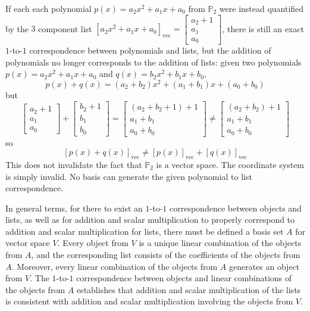 \documentclass{article}
\begin{document}
\vspace{1cm}
   
If each each polynomial \(p(x) = a_2 x^2 + a_1 x + a_0\) from \(\mathbb{P}_2\) were instead quantified by the \(3\) component list \([a_2 x^2 + a_1 x + a_0]_{\text{vec}} = \begin{bmatrix} a_2 + 1 \\ a_1 \\ a_0 \end{bmatrix}\), there is still an exact \(1\)-to-\(1\) correspondence between polynomials and lists, but the addition of polynomials no longer corresponds to the addition of lists: given two polynomials \(p(x) = a_2 x^2 + a_1 x + a_0\) and \(q(x) = b_2 x^2 + b_1 x + b_0\),
\[p(x) + q(x) = (a_2 + b_2)x^2 + (a_1 + b_1)x + (a_0 + b_0)\]
but
\[\begin{bmatrix} a_2 + 1 \\ a_1 \\ a_0 \end{bmatrix} + \begin{bmatrix} b_2 + 1 \\ b_1 \\ b_0 \end{bmatrix} = \begin{bmatrix} (a_2 + b_2 + 1) + 1 \\ a_1 + b_1 \\ a_0 + b_0 \end{bmatrix} \neq \begin{bmatrix} (a_2 + b_2) + 1 \\ a_1 + b_1 \\ a_0 + b_0 \end{bmatrix}\] 
so 
\[[p(x) + q(x)]_{\text{vec}} \neq [p(x)]_{\text{vec}} + [q(x)]_{\text{vec}}\] 
This does not invalidate the fact that \(\mathbb{P}_2\) is a vector space. The coordinate system is simply invalid. No basis can generate the given polynomial to list correspondence. 

\vspace{5mm}

In general terms, for there to exist an \(1\)-to-\(1\) correspondence between objects and lists, as well as for addition and scalar multiplication to properly correspond to addition and scalar multiplication for lists, there must be defined a basis set \(A\) for vector space \(V\). Every object from \(V\) is a unique linear combination of the objects from \(A\), and the corresponding list consists of the coefficients of the objects from \(A\). Moreover, every linear combination of the objects from \(A\) generates an object from \(V\). The \(1\)-to-\(1\) correspondence between objects and linear combinations of the objects from \(A\) establishes that addition and scalar multiplication of the lists is consistent with addition and scalar multiplication involving the objects from \(V\).
\end{document}
